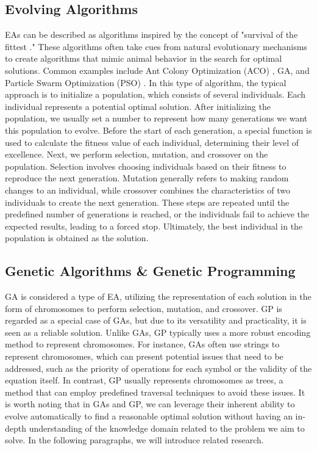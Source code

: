 \begin{ZhChapter}
    \subsection{Evolving Algorithms}
    EAs can be described as algorithms inspired by the concept of "survival of the fittest \cite{paul1988selection}." These algorithms often take cues from natural evolutionary mechanisms to create algorithms that mimic animal behavior in the search for optimal solutions. Common examples include Ant Colony Optimization (ACO) \cite{dorigo2006ant}, GA, and Particle Swarm Optimization (PSO) \cite{kennedy1995particle}. In this type of algorithm, the typical approach is to initialize a population, which consists of several individuals. Each individual represents a potential optimal solution. After initializing the population, we usually set a number to represent how many generations we want this population to evolve. Before the start of each generation, a special function is used to calculate the fitness value of each individual, determining their level of excellence. Next, we perform selection, mutation, and crossover on the population. Selection involves choosing individuals based on their fitness to reproduce the next generation. Mutation generally refers to making random changes to an individual, while crossover combines the characteristics of two individuals to create the next generation. These steps are repeated until the predefined number of generations is reached, or the individuals fail to achieve the expected results, leading to a forced stop. Ultimately, the best individual in the population is obtained as the solution.

    \subsection{Genetic Algorithms \& Genetic Programming}
    GA is considered a type of EA, utilizing the representation of each solution in the form of chromosomes to perform selection, mutation, and crossover. GP is regarded as a special case of GAs, but due to its versatility and practicality, it is seen as a reliable solution. Unlike GAs, GP typically uses a more robust encoding method to represent chromosomes. For instance, GAs often use strings to represent chromosomes, which can present potential issues that need to be addressed, such as the priority of operations for each symbol or the validity of the equation itself. In contrast, GP usually represents chromosomes as trees, a method that can employ predefined traversal techniques to avoid these issues. It is worth noting that in GAs and GP, we can leverage their inherent ability to evolve automatically to find a reasonable optimal solution without having an in-depth understanding of the knowledge domain related to the problem we aim to solve. In the following paragraphs, we will introduce related research.


\end{ZhChapter}
